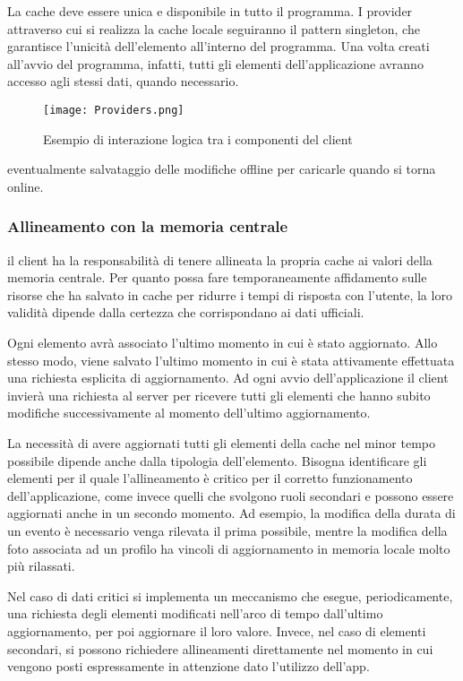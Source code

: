 La cache deve essere unica e disponibile in tutto il programma. 
I provider attraverso cui si realizza la cache locale seguiranno il pattern singleton, che garantisce l’unicità dell’elemento all’interno del programma. Una volta creati all’avvio del programma, infatti, tutti gli elementi dell’applicazione avranno accesso agli stessi dati, quando necessario.

\begin{figure}[h!]
    \centering
    \texttt{[image: Providers.png]}
    \caption{Esempio di interazione logica tra i componenti del client}
\end{figure}	

eventualmente salvataggio delle modifiche offline per caricarle quando si torna online. 

\subsubsection{ Allineamento con la memoria centrale}

il client ha la responsabilità di tenere allineata la propria cache ai valori della memoria centrale. Per quanto possa fare temporaneamente affidamento sulle risorse che ha salvato in cache per ridurre i tempi di risposta con l’utente, la loro validità dipende dalla certezza che corrispondano ai dati ufficiali. 

Ogni elemento avrà associato l’ultimo momento in cui è stato aggiornato. Allo stesso modo, viene salvato l’ultimo momento in cui è stata attivamente effettuata una richiesta esplicita di aggiornamento.  
Ad ogni avvio dell’applicazione il client invierà una richiesta al server per ricevere tutti gli elementi che hanno subito modifiche successivamente al momento dell’ultimo aggiornamento. 

La necessità di avere aggiornati tutti gli elementi della cache nel minor tempo possibile dipende anche dalla tipologia dell’elemento. Bisogna identificare gli elementi per il quale l’allineamento è critico per il corretto funzionamento dell’applicazione, come invece quelli che svolgono ruoli secondari e possono essere aggiornati anche in un secondo momento. Ad esempio, la modifica della durata di un evento è necessario venga rilevata il prima possibile, mentre la modifica della foto associata ad un profilo ha vincoli di aggiornamento in memoria locale molto più rilassati.

Nel caso di dati critici si implementa un meccanismo che esegue, periodicamente, una richiesta degli elementi modificati nell’arco di tempo dall’ultimo aggiornamento, per poi aggiornare il loro valore. Invece, nel caso di elementi secondari, si possono richiedere allineamenti direttamente nel momento in cui vengono posti espressamente in attenzione dato l’utilizzo dell’app.


